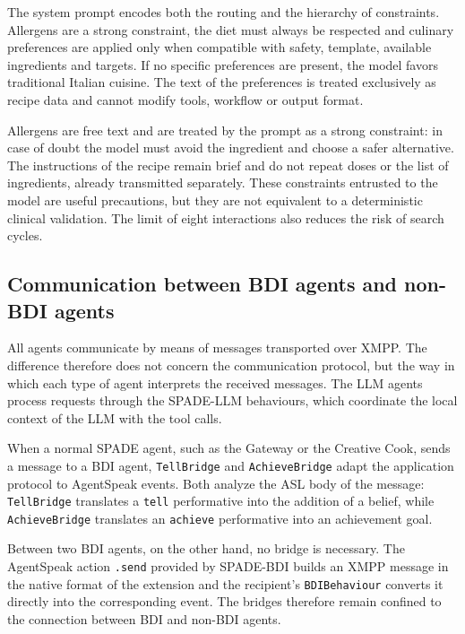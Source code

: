\documentclass[12pt,a4paper]{article}
\begin{document}
The system prompt encodes both the routing and the hierarchy of constraints. Allergens are a strong
constraint, the diet must always be respected and culinary preferences are applied only
when compatible with safety, template, available ingredients and targets. If no specific
preferences are present, the model favors traditional Italian cuisine. The text of the
preferences is treated exclusively as recipe data and cannot modify tools,
workflow or output format.

Allergens are free text and are treated by the prompt as a strong constraint: in case of doubt
the model must avoid the ingredient and choose a safer alternative. The instructions of the
recipe remain brief and do not repeat doses or the list of ingredients, already transmitted separately.
These constraints entrusted to the model are useful precautions, but they are not equivalent to a
deterministic clinical validation. The limit of eight interactions also reduces the risk of search cycles.

\subsection{Communication between BDI agents and non-BDI agents}

All agents communicate by means of messages transported over XMPP. The difference therefore does not concern
the communication protocol, but the way in which each type of agent interprets the
received messages. The LLM agents process requests through the SPADE-LLM behaviours, which
coordinate the local context of the LLM with the tool calls.

When a normal SPADE agent, such as the Gateway or the Creative Cook, sends a message to a
BDI agent, \texttt{TellBridge} and \texttt{AchieveBridge} adapt the application protocol to
AgentSpeak events. Both analyze the ASL body of the message: \texttt{TellBridge} translates a
\texttt{tell} performative into the addition of a belief, while \texttt{AchieveBridge} translates an
\texttt{achieve} performative into an achievement goal.

Between two BDI agents, on the other hand, no bridge is necessary. The AgentSpeak action \texttt{.send}
provided by SPADE-BDI builds an XMPP message in the native format of the extension and the
recipient's \texttt{BDIBehaviour} converts it directly into the corresponding event. The bridges
therefore remain confined to the connection between BDI and non-BDI agents.

\sloppy
\end{document}
